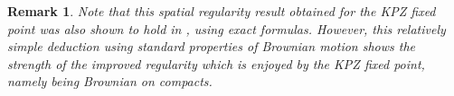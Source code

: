 \documentclass[12pt]{report}
\theoremstyle{plain}
\newtheorem{lemma}[theorem]{Lemma}
\newtheorem*{remark}{Remark}
\newcommand{\R}{\ensuremath{\mathbb{R}}}
\begin{document}
\begin{remark}
    Note that this spatial regularity result obtained for the KPZ fixed point was also shown to hold in \cite{matetski2021kpz}, using exact formulas. However, this relatively simple deduction using standard properties of Brownian motion shows the strength of the improved regularity which is enjoyed by the KPZ fixed point, namely being Brownian on compacts.
\end{remark}

\end{document}
